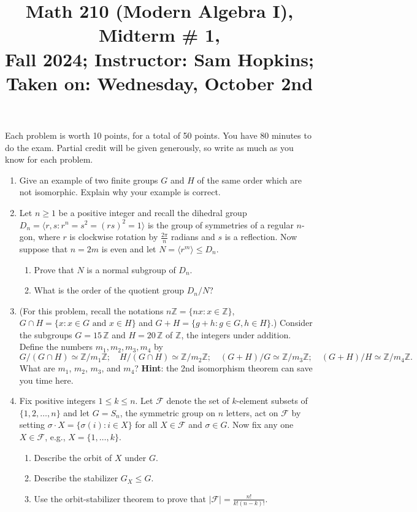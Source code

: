 \documentclass[11pt]{article}
\title{Math 210 (Modern Algebra I), Midterm \# 1, \\ {\normalsize Fall 2024; Instructor: Sam Hopkins; Taken on: Wednesday, October 2nd}}
\date{}
\begin{document}
\maketitle

Each problem is worth 10 points, for a total of 50 points. You have 80 minutes to do the exam. Partial credit will be given generously, so write as much as you know for each problem.

\thispagestyle{empty}
\begin{enumerate}

\item Give an example of two finite groups $G$ and $H$ of the same order which are not isomorphic. Explain why your example is correct.

\item Let $n \geq 1$ be a positive integer and recall the dihedral group $D_n = \langle r,s \colon r^n = s^2 = (rs)^2 = 1\rangle$ is the group of symmetries of a regular $n$-gon, where $r$ is clockwise rotation by $\frac{2\pi}{n}$ radians and $s$ is a reflection. Now suppose that $n=2m$ is even and let $N = \langle r^m \rangle \leq D_n$.
\begin{enumerate}
\item Prove that $N$ is a normal subgroup of $D_n$.
\item What is the order of the quotient group $D_n/N$?
\end{enumerate}

\item (For this problem, recall the notations $n\mathbb{Z}=\{nx\colon x\in \mathbb{Z}\}$, $G\cap H = \{x\colon x\in G \textrm{ and } x\in H\}$ and $G+H=\{g+h\colon g\in G, h\in H\}$.) Consider the subgroups $G = 15\,\mathbb{Z}$ and $H=20\,\mathbb{Z}$ of $\mathbb{Z}$, the integers under addition. Define the numbers $m_1,m_2,m_3,m_4$ by
\[ G/(G\cap H) \simeq \mathbb{Z}/m_1\mathbb{Z}; \quad H/(G\cap H) \simeq \mathbb{Z}/m_2\mathbb{Z};  \quad (G+H)/G \simeq \mathbb{Z}/m_3\mathbb{Z}; \quad (G+H)/H \simeq \mathbb{Z}/m_4\mathbb{Z}. \]
What are $m_1$, $m_2$, $m_3$, and $m_4$? {\bf Hint}: the 2nd isomorphism theorem can save you time here.

\item Fix positive integers $1 \leq k \leq n$. Let $\mathcal{F}$ denote the set of $k$-element subsets of $\{1,2,\ldots,n\}$ and let $G=S_n$, the symmetric group on $n$ letters, act on $\mathcal{F}$ by setting $\sigma \cdot X = \{\sigma(i)\colon i \in X\}$ for all $X\in \mathcal{F}$ and $\sigma \in G$. Now fix any one $X\in \mathcal{F}$, e.g., $X=\{1,\ldots,k\}$.
\begin{enumerate}
\item Describe the orbit of $X$ under $G$.
\item Describe the stabilizer $G_X \leq G$.
\item Use the orbit-stabilizer theorem to prove that $|\mathcal{F}| = \frac{n!}{k!(n-k)!}$.
\end{enumerate}


\end{enumerate}
\end{document}
